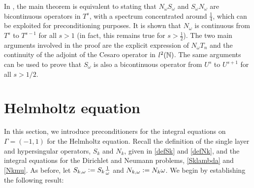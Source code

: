 \documentclass[a4paper]{article}
\begin{document}
\begin{Rem}
	In \cite{bruno2012second}, the main theorem is equivalent to stating that $N_\omega S_\omega$ and $S_\omega N_\omega$ are bicontinuous operators in $T^s$, with a spectrum concentrated around $\frac{1}{4}$, which can be exploited for preconditioning purposes. It is shown that $N_\omega$ is continuous from $T^s$ to $T^{s-1}$ for all $s >1$ (in fact, this remains true for $s > \frac{1}{2}$). The two main arguments involved in the proof are the explicit expression of $N_\omega T_n$ and the continuity of the adjoint of the Cesaro operator in $l^2(\mathbb{N})$. The same arguments can be used to prove that $S_\omega$ is also a bicontinuous operator from $U^s$ to $U^{s+1}$ for all $s > 1/2$. 
\end{Rem}



\section{Helmholtz equation}
	
	In this section, we introduce preconditioners for the integral equations on $\Gamma = (-1,1)$ for the Helmholtz equation. Recall the definition of the single layer and hypersingular operators, $S_k$ and $N_k$, given in \eqref{defSk} and \eqref{defNk}, and the integral equations for the Dirichlet and Neumann problems, \eqref{Sklambda} and \eqref{Nkmu}. As before, let $S_{k,\omega} \mathrel{\mathop:}= S_k \frac{1}{\omega}$ and $N_{k,\omega} \mathrel{\mathop:}= N_k \omega$. We begin by establishing the following result:
	
\end{document}
